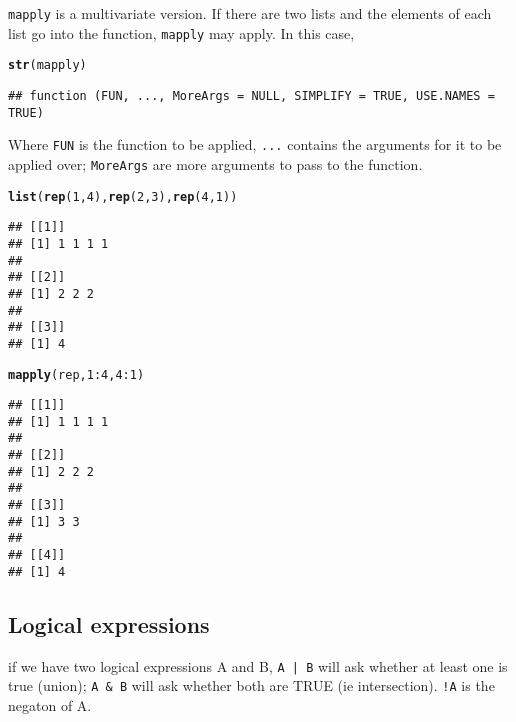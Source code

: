 \documentclass[12pt, a4paper, oneside]{article}\usepackage[]{graphicx}\usepackage[]{color}
\makeatletter
\newcommand{\hlnum}[1]{\textcolor[rgb]{0.686,0.059,0.569}{#1}}%
\newcommand{\hlopt}[1]{\textcolor[rgb]{0,0,0}{#1}}%
\newcommand{\hlstd}[1]{\textcolor[rgb]{0.345,0.345,0.345}{#1}}%
\newcommand{\hlkwd}[1]{\textcolor[rgb]{0.737,0.353,0.396}{\textbf{#1}}}%
\newenvironment{kframe}{%
 \def\at@end@of@kframe{}%
 \ifinner\ifhmode%
  \def\at@end@of@kframe{\end{minipage}}%
  \begin{minipage}{\columnwidth}%
 \fi\fi%
 \def\FrameCommand##1{\hskip\@totalleftmargin \hskip-\fboxsep
 \colorbox{shadecolor}{##1}\hskip-\fboxsep
     \hskip-\linewidth \hskip-\@totalleftmargin \hskip\columnwidth}%
 \MakeFramed {\advance\hsize-\width
   \@totalleftmargin\z@ \linewidth\hsize
   \@setminipage}}%
 {\par\unskip\endMakeFramed%
 \at@end@of@kframe}
\newenvironment{knitrout}{}{} %
\makeatother
\begin{document}
\lstinline{mapply} is a multivariate version.  If there are two lists and the elements of each list go into the function, \lstinline{mapply} may apply. In this case, 
\begin{knitrout}
\color{fgcolor}\begin{kframe}
\begin{alltt}
\hlkwd{str}\hlstd{(mapply)}
\end{alltt}
\begin{verbatim}
## function (FUN, ..., MoreArgs = NULL, SIMPLIFY = TRUE, USE.NAMES = TRUE)
\end{verbatim}
\end{kframe}
\end{knitrout}

Where \lstinline{FUN} is the function to be applied, \lstinline{...} contains the arguments for it to be applied over; \lstinline{MoreArgs} are more arguments to pass to the function.

\begin{knitrout}
\color{fgcolor}\begin{kframe}
\begin{alltt}
\hlkwd{list}\hlstd{(}\hlkwd{rep}\hlstd{(}\hlnum{1}\hlstd{,} \hlnum{4}\hlstd{),} \hlkwd{rep}\hlstd{(}\hlnum{2}\hlstd{,} \hlnum{3}\hlstd{),} \hlkwd{rep}\hlstd{(}\hlnum{4}\hlstd{,} \hlnum{1}\hlstd{))}
\end{alltt}
\begin{verbatim}
## [[1]]
## [1] 1 1 1 1
## 
## [[2]]
## [1] 2 2 2
## 
## [[3]]
## [1] 4
\end{verbatim}
\begin{alltt}
\hlkwd{mapply}\hlstd{(rep,} \hlnum{1}\hlopt{:}\hlnum{4}\hlstd{,} \hlnum{4}\hlopt{:}\hlnum{1}\hlstd{)}
\end{alltt}
\begin{verbatim}
## [[1]]
## [1] 1 1 1 1
## 
## [[2]]
## [1] 2 2 2
## 
## [[3]]
## [1] 3 3
## 
## [[4]]
## [1] 4
\end{verbatim}
\end{kframe}
\end{knitrout}

\subsection{Logical expressions}
if we have two logical expressions A and B, \lstinline{A | B} will ask whether at least one is true (union); \lstinline{A & B} will ask whether both are TRUE (ie intersection).  \lstinline{!A} is the negaton of A. 
\end{document}
